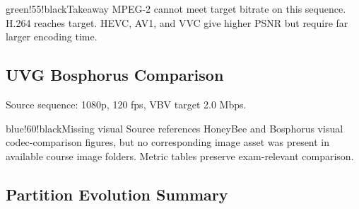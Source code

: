 \begin{calloutbox}{green!55!black}{Takeaway}
MPEG-2 cannot meet target bitrate on this sequence. H.264 reaches target. HEVC, AV1, and VVC give higher PSNR but require far larger encoding time.
\end{calloutbox}

\subsection{UVG Bosphorus Comparison}

Source sequence: 1080p, 120 fps, VBV target 2.0 Mbps.

\begin{center}
\end{center}

\begin{calloutbox}{blue!60!black}{Missing visual}
Source references HoneyBee and Bosphorus visual codec-comparison figures, but no corresponding image asset was present in available course image folders. Metric tables preserve exam-relevant comparison.
\end{calloutbox}

\subsection{Partition Evolution Summary}

\begin{center}
\end{center}


